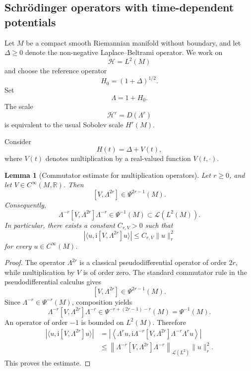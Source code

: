 \documentclass[11pt]{amsart}
\theoremstyle{plain}
\newtheorem{lemma}[theorem]{Lemma}
\theoremstyle{definition}
\theoremstyle{remark}
\begin{document}
\subsection{Schrödinger operators with time-dependent potentials}
\label{subsec:schrodinger-time-dependent-potentials}

Let \(M\) be a compact smooth Riemannian manifold without boundary, and let
\(\Delta\geq 0\) denote the non-negative Laplace--Beltrami operator. We work
on
\[
\mathcal{H}=L^{2}(M)
\]
and choose the reference operator
\[
H_{0}=(1+\Delta)^{1/2}.
\]
Set
\[
\Lambda=1+H_{0}.
\]
The scale
\[
\mathcal{H}^{r}=D(\Lambda^{r})
\]
is equivalent to the usual Sobolev scale \(H^{r}(M)\).

Consider
\[
H(t)=\Delta+V(t),
\]
where \(V(t)\) denotes multiplication by a real-valued function
\(V(t,\cdot)\).

\begin{lemma}[Commutator estimate for multiplication operators]
\label{lem:potential-commutator-estimate}
Let \(r\geq 0\), and let \(V\in C^{\infty}(M,\mathbb{R})\). Then
\[
[V,\Lambda^{2r}]
\in
\Psi^{2r-1}(M).
\]
Consequently,
\[
\Lambda^{-r}[V,\Lambda^{2r}]\Lambda^{-r}
\in
\Psi^{-1}(M)
\subset
\mathcal{L}(L^{2}(M)).
\]
In particular, there exists a constant \(C_{r,V}>0\) such that
\[
\left|
\langle u,\mathrm{i}[V,\Lambda^{2r}]u\rangle
\right|
\leq
C_{r,V}\|u\|_{r}^{2}
\]
for every \(u\in C^{\infty}(M)\).
\end{lemma}

\begin{proof}
The operator \(\Lambda^{2r}\) is a classical pseudodifferential operator of
order \(2r\), while multiplication by \(V\) is of order zero. The standard
commutator rule in the pseudodifferential calculus gives
\[
[V,\Lambda^{2r}]
\in
\Psi^{2r-1}(M).
\]
Since \(\Lambda^{-r}\in\Psi^{-r}(M)\), composition yields
\[
\Lambda^{-r}[V,\Lambda^{2r}]\Lambda^{-r}
\in
\Psi^{-r+(2r-1)-r}(M)
=
\Psi^{-1}(M).
\]
An operator of order \(-1\) is bounded on \(L^{2}(M)\). Therefore
\[
\begin{split}
\left|
\langle u,\mathrm{i}[V,\Lambda^{2r}]u\rangle
\right|
&=
\left|
\left\langle
\Lambda^{r}u,
\mathrm{i}\Lambda^{-r}[V,\Lambda^{2r}]
\Lambda^{-r}\Lambda^{r}u
\right\rangle
\right|
\\
&\leq
\left\|
\Lambda^{-r}[V,\Lambda^{2r}]\Lambda^{-r}
\right\|_{\mathcal{L}(L^{2})}
\|u\|_{r}^{2}.
\end{split}
\]
This proves the estimate.
\end{proof}
\end{document}
